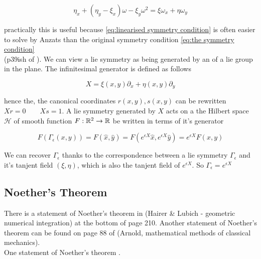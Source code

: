\documentclass[12pt]{article}
\begin{document}
\begin{equation}\label{eq:linearised symmetry condition}
    \eta_x + (\eta_y - \xi_x)\omega - \xi_y\omega^2 = \xi \omega_x + \eta \omega_y
\end{equation}

practically this is useful because \eqref{eq:linearised symmetry condition} is often easier to solve by Anzats than the original symmetry condition \eqref{eq:the symmetry condition}\\

(p39ish of \cite{Symmetry-methods}). We can view a lie symmetry as being generated by an  of a lie group in the plane. The infinitesimal generator is defined as follows

\begin{equation}\label{eq:infinitesimal operator}
    X = \xi(x,y)\partial_x + \eta(x,y)\partial_y
\end{equation}

hence the, the canonical coordinates $r(x,y),s(x,y)$ can be rewritten $Xr = 0\qquad Xs = 1$. A lie symmetry generated by $X$ acts on a the Hilbert space $\mathcal H$ of smooth function $F : \mathbb{R}^2 \to \mathbb{R}$ be written in terms of it's generator

\begin{equation}\label{eq:generator of lie symmetry}
    F(\Gamma_\epsilon (x,y)) = F(\hat x,\hat y) = F(e^{\epsilon X}\hat x , e^{\epsilon X}\hat y) = e^{\epsilon X} F(x,y)
\end{equation}

We can recover $\Gamma_\epsilon$ thanks to the correspondence between a lie symmetry $\Gamma_\epsilon$ and it's tanjent field $(\xi,\eta)$, which is also the tanjent field of $e^{\epsilon X}$. So $\Gamma_\epsilon = e^{\epsilon X}$ \\

\subsection{Noether's Theorem}

There is a statement of Noether's theorem in \cite{Numerical} (Hairer \& Lubich - geometric numerical integration) at the bottom of page 210. Another statement of Noether's theorem can be found on page 88 of \cite{Arnold} (Arnold, mathematical methods of classical mechanics). \\

One statement of Noether's theorem \cite{Arnold}.\\
\end{document}
